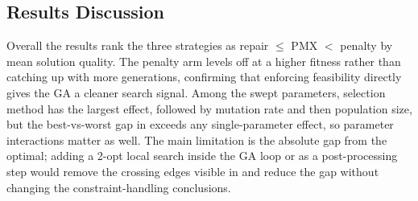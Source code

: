 \subsection{Results Discussion}
\label{T4:Discussion}

Overall the results rank the three strategies as repair $\le$ PMX $<$
penalty by mean solution quality. The penalty arm levels off at a higher
fitness rather than catching up with more generations, confirming that
enforcing feasibility directly gives the GA a cleaner search signal.
Among the swept parameters, selection method has the largest effect,
followed by mutation rate and then population size, but the
best-vs-worst gap in  exceeds any
single-parameter effect, so parameter interactions matter as well. The
main limitation is the absolute gap from the optimal; adding a 2-opt
local search inside the GA loop or as a post-processing step would
remove the crossing edges visible in  and reduce
the gap without changing the constraint-handling conclusions.
